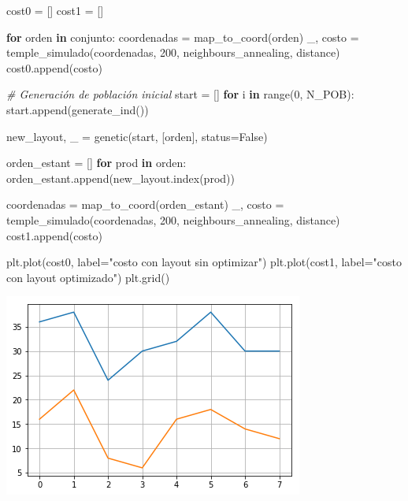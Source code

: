 \documentclass[
]{article}
\newenvironment{Shaded}{}{}
\newcommand{\BuiltInTok}[1]{#1}
\newcommand{\CommentTok}[1]{\textcolor[rgb]{0.38,0.63,0.69}{\textit{#1}}}
\newcommand{\ControlFlowTok}[1]{\textcolor[rgb]{0.00,0.44,0.13}{\textbf{#1}}}
\newcommand{\DecValTok}[1]{\textcolor[rgb]{0.25,0.63,0.44}{#1}}
\newcommand{\KeywordTok}[1]{\textcolor[rgb]{0.00,0.44,0.13}{\textbf{#1}}}
\newcommand{\NormalTok}[1]{#1}
\newcommand{\OperatorTok}[1]{\textcolor[rgb]{0.40,0.40,0.40}{#1}}
\newcommand{\StringTok}[1]{\textcolor[rgb]{0.25,0.44,0.63}{#1}}
\newcommand{\VariableTok}[1]{\textcolor[rgb]{0.10,0.09,0.49}{#1}}
\begin{document}
\begin{Shaded}
\begin{Highlighting}[]
\NormalTok{cost0 }\OperatorTok{=}\NormalTok{ []}
\NormalTok{cost1 }\OperatorTok{=}\NormalTok{ []}

\ControlFlowTok{for}\NormalTok{ orden }\KeywordTok{in}\NormalTok{ conjunto:}
\NormalTok{    coordenadas }\OperatorTok{=}\NormalTok{ map_to_coord(orden)}
\NormalTok{    _, costo }\OperatorTok{=}\NormalTok{ temple_simulado(coordenadas, }\DecValTok{200}\NormalTok{, neighbours_annealing, distance)}
\NormalTok{    cost0.append(costo)}
    
    \CommentTok{# Generación de población inicial}
\NormalTok{    start }\OperatorTok{=}\NormalTok{ []}
    \ControlFlowTok{for}\NormalTok{ i }\KeywordTok{in} \BuiltInTok{range}\NormalTok{(}\DecValTok{0}\NormalTok{, N_POB):}
\NormalTok{        start.append(generate_ind())}
    
\NormalTok{    new_layout, _ }\OperatorTok{=}\NormalTok{ genetic(start, [orden], status}\OperatorTok{=}\VariableTok{False}\NormalTok{)}
    
\NormalTok{    orden_estant }\OperatorTok{=}\NormalTok{ []}
    \ControlFlowTok{for}\NormalTok{ prod }\KeywordTok{in}\NormalTok{ orden:}
\NormalTok{        orden_estant.append(new_layout.index(prod))}
    
\NormalTok{    coordenadas }\OperatorTok{=}\NormalTok{ map_to_coord(orden_estant)}
\NormalTok{    _, costo }\OperatorTok{=}\NormalTok{ temple_simulado(coordenadas, }\DecValTok{200}\NormalTok{, neighbours_annealing, distance)}
\NormalTok{    cost1.append(costo)}
    
\end{Highlighting}
\end{Shaded}

\begin{Shaded}
\begin{Highlighting}[]
\NormalTok{plt.plot(cost0, label}\OperatorTok{=}\StringTok{"costo con layout sin optimizar"}\NormalTok{)}
\NormalTok{plt.plot(cost1, label}\OperatorTok{=}\StringTok{"costo con layout optimizado"}\NormalTok{)}
\NormalTok{plt.grid()}
\end{Highlighting}
\end{Shaded}

\includegraphics{output_15_0.png}
\end{document}
